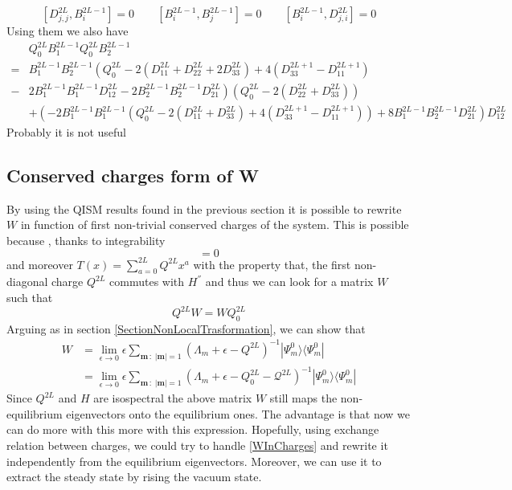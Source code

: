 \documentclass[10pt]{article}
\numberwithin{equation}{section}
\numberwithin{equation}{subsection}
\begin{document}
\begin{equation}
\left[D_{j,j}^{2L},B_{i}^{2L-1}\right]=0\qquad \left[B_{i}^{2L-1},B_{j}^{2L-1}\right]=0\qquad \left[B_{i}^{2L-1},D_{j,i}^{2L}\right]=0%
\end{equation}
{\color{blue}Using them we also have 
\begin{equation}
\begin{split}
	&Q_{0}^{2L}B_{1}^{2L-1}Q_{0}^{2L}B_{2}^{2L-1}\\=&B_{1}^{2L-1}B_{2}^{2L-1}\left(Q_{0}^{2L}-2(D_{11}^{2L}+D_{22}^{2L}+2D_{33}^{2L})+4(D_{33}^{2L+1}-D_{11}^{2L+1})\right.\\-&\left.2B_{1}^{2L-1}B_{1}^{2L-1}D_{12}^{2L}-2B_{2}^{2L-1}B_{2}^{2L-1}D_{21}^{2L}\right)\left(Q_{0}^{2L}-2(D_{22}^{2L}+D_{33}^{2L})\right)
	\\&+
	\left(-2B_{1}^{2L-1}B_{1}^{2L-1}\left(Q_{0}^{2L}-2(D_{11}^{2L}+D_{33}^{2L})+4(D_{33}^{2L+1}-D_{11}^{2L+1})\right)+8B_{1}^{2L-1}B_{2}^{2L-1}D_{21}^{2L}\right)D_{12}^{2L}
\end{split}
\end{equation}}{\color{blue}Probably it is not useful}
\subsection{Conserved charges form of W}
By using the QISM results found in the previous section it is possible to rewrite $W$ in function of first non-trivial conserved charges of the system. This is possible because , thanks to integrability
\begin{equation}
	[H,T(x)]=0
\end{equation}
and moreover $T(x)=\sum_{a=0}^{2L}Q^{2L}x^{a}$ with the property that, the first non-diagonal charge $Q^{2L}$ commutes with $H^{''}$ and thus we can look for a matrix $W$ such that 
\begin{equation}
	Q^{2L}W=WQ_{0}^{2L}
\end{equation}
Arguing as in section \ref{SectionNonLocalTrasformation}, we can show that 
\begin{equation}\label{WInCharges}
	\begin{split}
	W&=\lim_{\epsilon\to 0}\epsilon\sum_{\bm{m}\,:\;|\bm{m}|=1}\left(\Lambda_{m}+\epsilon-Q^{2L}\right)^{-1}|\Psi_{m}^{0}\rangle\langle \Psi_{m}^{0}|\\&=\lim_{\epsilon\to 0}\epsilon\sum_{\bm{m}\,:\;|\bm{m}|=1}\left(\Lambda_{m}+\epsilon-Q^{2L}_{0}-\mathcal{Q}^{2L}\right)^{-1}|\Psi_{m}^{0}\rangle\langle \Psi_{m}^{0}|
\end{split}
\end{equation}
Since $Q^{2L}$ and $H$ are isospectral the above matrix $W$ still maps the non-equilibrium eigenvectors onto the equilibrium ones. The advantage is that now we can do more with this more with this expression. Hopefully, using exchange relation between charges, we could try to handle \eqref{WInCharges} and rewrite it independently from the equilibrium eigenvectors. Moreover, we can use it to extract the steady state by rising the vacuum state. 
\end{document}
